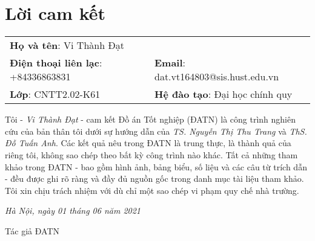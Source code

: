 \documentclass[a4paper, 13pt, oneside]{report}
\begin{document}
\pagebreak
{}

\chapter*{\centering Lời cam kết}

    \hspace*{-0.3cm}
    \begin{tabular}{ll}
    \textbf{Họ và tên}: Vi Thành Đạt &  \\
    \textbf{Điện thoại liên lạc}: +84336863831 & \textbf{Email}: dat.vt164803@sis.hust.edu.vn \\
    \textbf{Lớp}: CNTT2.02-K61 & \textbf{Hệ đào tạo}: Đại học chính quy \\
    \end{tabular}
    \hspace*{-0.3cm}
    \vspace{0.5cm}
    
    Tôi - \textit{Vi Thành Đạt} - cam kết Đồ án Tốt nghiệp (ĐATN) là công trình nghiên cứu của bản thân tôi dưới sự hướng dẫn của \textit{TS. Nguyễn Thị Thu Trang} và \textit{ThS. Đỗ Tuấn Anh}. Các kết quả nêu trong ĐATN là trung thực, là thành quả của riêng tôi, không sao chép theo bất kỳ công trình nào khác. Tất cả những tham khảo trong ĐATN - bao gồm hình ảnh, bảng biểu, số liệu và các câu từ trích dẫn  - đều được ghi rõ ràng và đầy đủ nguồn gốc trong danh mục tài liệu tham khảo. Tôi xin chịu trách nhiệm với dù chỉ một sao chép vi phạm quy chế nhà trường.
    
    \begin{flushright}
        \textit{Hà Nội, ngày 01 tháng 06 năm 2021}\\
    \end{flushright}
    
    \begin{flushright}
        \begin{minipage}{0.45\textwidth} 
            \begin{center}
                Tác giả ĐATN\\
            \end{center}
        \end{minipage}
    \end{flushright}
    
    \vspace{2cm}
    
\end{document}
